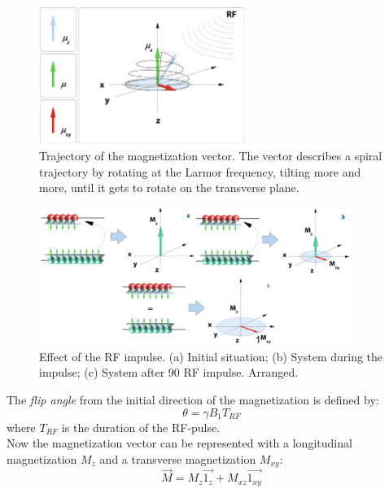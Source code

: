 \begin{figure}[h]
    \centering
    \includegraphics[width=0.6\textwidth]{images/trajectory_magnetization.png}
    \caption{Trajectory of the magnetization vector. The vector describes a spiral trajectory by rotating at the Larmor frequency, tilting more and more, until it gets to rotate on the transverse plane. \cite{elementiRisonanza}}
    \label{fig:trajectory_magnetization}
 \end{figure}

 \begin{figure}[h]
    \centering
    \includegraphics[width=0.9\textwidth]{images/energy_gaining.png}
    \caption{Effect of the RF impulse. (a) Initial situation; (b) System during the impulse; (c) System after 90 RF impulse. \cite{elementiRisonanza} Arranged.}
    \label{fig:energy_gaining}
 \end{figure}

 \noindent The \emph{flip angle} from the initial direction of the magnetization is defined by:
 \[\theta = \gamma B_{1}T_{RF}\]
 where $T_{RF}$ is the duration of the RF-pulse.\\
 Now the magnetization vector can be represented with a longitudinal magnetization $M_z$ and a transverse magnetization $M_{xy}$:
 \begin{equation}
    \vec{M}=M_{z}\vec{1_{z}}+M_{xz}\vec{1_{xy}}
 \end{equation}

